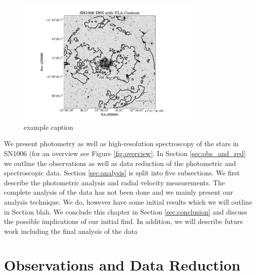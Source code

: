 \begin{figure}[htbp] %
   \centering
   \includegraphics[width=0.8\textwidth]{chapter_sn1006/plots/sn1006_overlay_withsm.pdf} 
   \caption{example caption}
   \label{fig:overview_sn1006}
\end{figure}

We present photometry as well as high-resolution spectroscopy of the stars in SN1006 (for an overview see Figure \ref{fig:overview}. In Section \ref{sec:obs_and_red} we outline the observations as well as data reduction of the photometric and spectroscopic data. Section \ref{sec:analysis} is split into five subsections. We first describe the photometric analysis and radial velocity measurements. The complete analysis of the data has not been done and we mainly present our analysis technique. We do, however have some initial results which we will outline in Section blah. We conclude this chapter in Section \ref{sec:conclusion} and discuss the possible implications of our initial find. In addition, we will describe future work including the final analysis of the data 


\section{Observations and Data Reduction}

